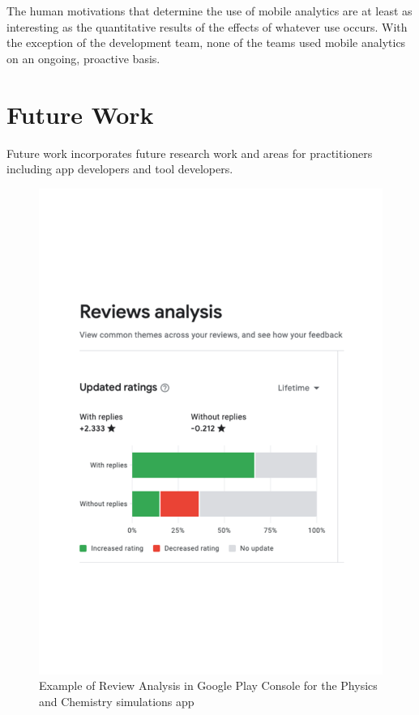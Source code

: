 The human motivations that determine the use of mobile analytics are at least as interesting as the quantitative results of the effects of whatever use occurs. With the exception of the  development team, none of the teams used mobile analytics on an ongoing, proactive basis. 


\clearpage
\section{Future Work}
Future work incorporates future research work and areas for practitioners including app developers and tool developers.

\begin{figure}
    \centering
    \includegraphics[width=\linewidth]{images/google-play-console/PhET-Review-Analysis-Screenshot-2022-09-07.pdf}
    \caption{Example of Review Analysis in Google Play Console for the Physics and Chemistry simulations app}
    \label{fig:PhET-Review-Analysis-Screenshot-2022-09-07}
\end{figure}

